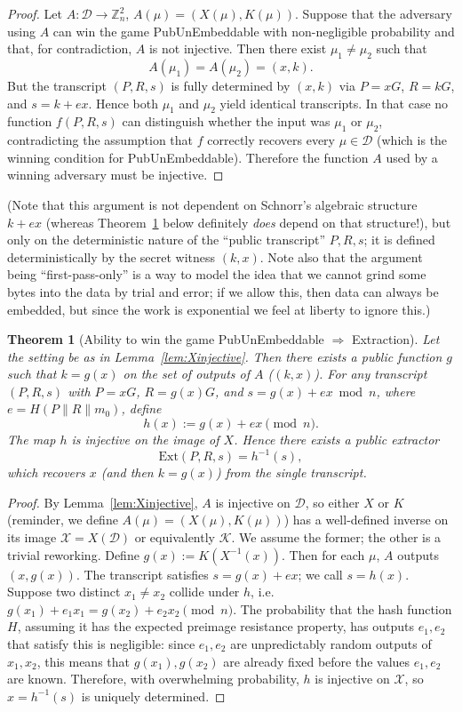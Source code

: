\documentclass[10pt,a4paper]{article}
\newtheorem{theorem}{Theorem}
\theoremstyle{definition}   %
\theoremstyle{remark}       %
\begin{document}
\begin{proof}
Let $A:\mathcal{D}\to \mathbb{Z}_n^2$, $A(\mu)=(X(\mu),K(\mu))$.
Suppose that the adversary using $A$ can win the game PubUnEmbeddable with non-negligible probability and that, for contradiction, $A$ is not injective.
Then there exist $\mu_1\neq \mu_2$ such that
\[
A(\mu_1) = A(\mu_2) = (x,k).
\]
But the transcript $(P,R,s)$ is fully determined by $(x,k)$ via
$P=xG$, $R=kG$, and $s=k+ex$. Hence both $\mu_1$ and $\mu_2$ yield
identical transcripts. In that case no function $f(P,R,s)$ can
distinguish whether the input was $\mu_1$ or $\mu_2$, contradicting
the assumption that $f$ correctly recovers every $\mu\in\mathcal D$ (which is the winning condition for PubUnEmbeddable).
Therefore the function $A$ used by a winning adversary must be injective.
\end{proof}

(Note that this argument is not dependent on Schnorr's algebraic structure $k + ex$ (whereas Theorem~\ref{thm:extraction} below definitely \emph{does} depend on that structure!), but only on the deterministic nature of the ``public transcript'' $P, R, s$; it is defined deterministically by the secret witness $(k, x)$. Note also that the argument being ``first-pass-only'' is a way to model the idea that we cannot grind some bytes into the data by trial and error; if we allow this, then data can always be embedded, but since the work is exponential we feel at liberty to ignore this.)

\begin{theorem}[Ability to win the game PubUnEmbeddable $\Rightarrow$ Extraction]
\label{thm:extraction}
Let the setting be as in Lemma~\ref{lem:Xinjective}.
Then there exists a public function $g$ such that $k=g(x)$ on the set of outputs of $A$ ($(k, x)$).
For any transcript $(P,R,s)$ with $P=xG$, $R=g(x)G$, and $s=g(x)+ex\bmod n$,
where $e=H(P\|R\|m_0)$, define
\[
h(x) := g(x) + e x \pmod n.
\]
The map $h$ is injective on the image of $X$. Hence there exists a public extractor
\[
\mathrm{Ext}(P,R,s) = h^{-1}(s),
\]
which recovers $x$ (and then $k=g(x)$) from the single transcript.
\end{theorem}

\begin{proof}
By Lemma~\ref{lem:Xinjective}, $A$ is injective on $\mathcal{D}$,
so either $X$ or $K$ (reminder, we define $A(\mu) = (X(\mu), K(\mu))$) has a well-defined inverse on its image $\mathcal{X}=X(\mathcal{D})$ or equivalently $\mathcal{K}$. We assume the former; the other is a trivial reworking.
Define $g(x):=K(X^{-1}(x))$. Then for each $\mu$, $A$ outputs $(x,g(x))$.
The transcript satisfies $s=g(x)+ex$; we call $s = h(x)$.
Suppose two distinct $x_1\neq x_2$ collide under $h$, i.e.
$g(x_1)+e_1 x_1 = g(x_2)+e_2 x_2 \pmod n$.
The probability that the hash function $H$, assuming it has the expected preimage resistance property, has outputs $e_1, e_2$ that satisfy this is negligible: since $e_1, e_2$ are unpredictably random outputs of $x_1, x_2$, this means that $g(x_1), g(x_2)$ are already fixed before the values $e_1, e_2$ are known. Therefore, with overwhelming probability, $h$ is injective on $\mathcal{X}$, so $x=h^{-1}(s)$ is uniquely determined.
\end{proof}
\end{document}
